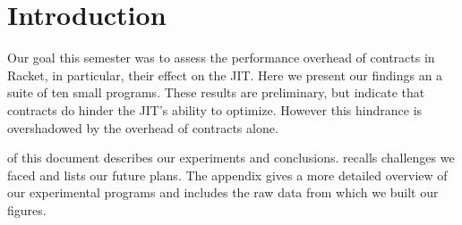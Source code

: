 \section{Introduction}
\label{intro}

Our goal this semester was to assess the performance overhead of contracts in Racket, in particular, their effect on the JIT.
Here we present our findings an a suite of ten small programs.
These results are preliminary, but indicate that contracts do hinder the JIT's ability to optimize.
However this hindrance is overshadowed by the overhead of contracts alone.

 of this document describes our experiments and conclusions.
 recalls challenges we faced and lists our future plans.
The appendix gives a more detailed overview of our experimental programs and includes the raw data from which we built our figures.

